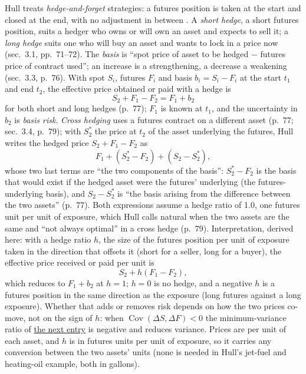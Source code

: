 \begin{qfdefinition}\label{def:futures-hedge-basis}
 Hull treats \emph{hedge-and-forget} strategies: a futures position is taken at the start and closed at the end, with no adjustment in between \citep[chap.~3, ``Hedging Strategies Using Futures'', p.~70]{s7-hulloptions}. A \emph{short hedge}, a short futures position, suits a hedger who owns or will own an asset and expects to sell it; a \emph{long hedge} suits one who will buy an asset and wants to lock in a price now (sec.~3.1, pp.~71--72). The \emph{basis} is ``spot price of asset to be hedged $-$ futures price of contract used''; an increase is a strengthening, a decrease a weakening (sec.~3.3, p.~76). With spot $S_i$, futures $F_i$ and basis $b_i=S_i-F_i$ at the start $t_1$ and end $t_2$, the effective price obtained or paid with a hedge is
\[ S_2+F_1-F_2=F_1+b_2 \]
for both short and long hedges (p.~77); $F_1$ is known at $t_1$, and the uncertainty in $b_2$ is \emph{basis risk}. \emph{Cross hedging} uses a futures contract on a different asset (p.~77; sec.~3.4, p.~79); with $S_2^*$ the price at $t_2$ of the asset underlying the futures, Hull writes the hedged price $S_2+F_1-F_2$ as
\[ F_1+(S_2^*-F_2)+(S_2-S_2^*), \]
whose two last terms are ``the two components of the basis'': $S_2^*-F_2$ is the basis that would exist if the hedged asset were the futures' underlying (the futures-underlying basis), and $S_2-S_2^*$ is ``the basis arising from the difference between the two assets'' (p.~77). Both expressions assume a hedge ratio of 1.0, one futures unit per unit of exposure, which Hull calls natural when the two assets are the same and ``not always optimal'' in a cross hedge (p.~79). Interpretation, derived here: with a hedge ratio $h$, the size of the futures position per unit of exposure taken in the direction that offsets it (short for a seller, long for a buyer), the effective price received or paid per unit is
\[ S_2+h(F_1-F_2), \]
which reduces to $F_1+b_2$ at $h=1$; $h=0$ is no hedge, and a negative $h$ is a futures position in the same direction as the exposure (long futures against a long exposure). Whether that adds or removes risk depends on how the two prices co-move, not on the sign of $h$: when $\operatorname{Cov}(\Delta S,\Delta F)<0$ the minimum-variance ratio of \hyperref[mod:minimum-variance-hedge-ratio]{the next entry} is negative and reduces variance. Prices are per unit of each asset, and $h$ is in futures units per unit of exposure, so it carries any conversion between the two assets' units (none is needed in Hull's jet-fuel and heating-oil example, both in gallons).


\end{qfdefinition}
